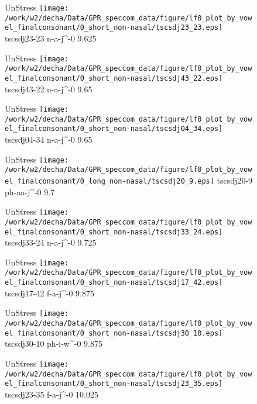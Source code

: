 \documentclass{article}
\begin{document}
\begin{figure}[t]
\begin{minipage}[b]{.24\textwidth}
UnStress
\centering
\texttt{[image: /work/w2/decha/Data/GPR\_speccom\_data/figure/lf0\_plot\_by\_vowel\_finalconsonant/0\_short\_non-nasal/tscsdj23\_23.eps]}
tscsdj23-23 n-a-j\textasciicircum-0 9.625
\end{minipage}
\begin{minipage}[b]{.24\textwidth}
UnStress
\centering
\texttt{[image: /work/w2/decha/Data/GPR\_speccom\_data/figure/lf0\_plot\_by\_vowel\_finalconsonant/0\_short\_non-nasal/tscsdj43\_22.eps]}
tscsdj43-22 n-a-j\textasciicircum-0 9.65
\end{minipage}
\begin{minipage}[b]{.24\textwidth}
UnStress
\centering
\texttt{[image: /work/w2/decha/Data/GPR\_speccom\_data/figure/lf0\_plot\_by\_vowel\_finalconsonant/0\_short\_non-nasal/tscsdj04\_34.eps]}
tscsdj04-34 n-a-j\textasciicircum-0 9.65
\end{minipage}
\begin{minipage}[b]{.24\textwidth}
UnStress
\centering
\texttt{[image: /work/w2/decha/Data/GPR\_speccom\_data/figure/lf0\_plot\_by\_vowel\_finalconsonant/0\_long\_non-nasal/tscsdj20\_9.eps]}
tscsdj20-9 ph-aa-j\textasciicircum-0 9.7
\end{minipage}
\end{figure}
\clearpage
\begin{figure}[t]
\begin{minipage}[b]{.24\textwidth}
UnStress
\centering
\texttt{[image: /work/w2/decha/Data/GPR\_speccom\_data/figure/lf0\_plot\_by\_vowel\_finalconsonant/0\_short\_non-nasal/tscsdj33\_24.eps]}
tscsdj33-24 n-a-j\textasciicircum-0 9.725
\end{minipage}
\begin{minipage}[b]{.24\textwidth}
UnStress
\centering
\texttt{[image: /work/w2/decha/Data/GPR\_speccom\_data/figure/lf0\_plot\_by\_vowel\_finalconsonant/0\_short\_non-nasal/tscsdj17\_42.eps]}
tscsdj17-42 f-a-j\textasciicircum-0 9.875
\end{minipage}
\begin{minipage}[b]{.24\textwidth}
UnStress
\centering
\texttt{[image: /work/w2/decha/Data/GPR\_speccom\_data/figure/lf0\_plot\_by\_vowel\_finalconsonant/0\_short\_non-nasal/tscsdj30\_10.eps]}
tscsdj30-10 ph-i-w\textasciicircum-0 9.875
\end{minipage}
\begin{minipage}[b]{.24\textwidth}
UnStress
\centering
\texttt{[image: /work/w2/decha/Data/GPR\_speccom\_data/figure/lf0\_plot\_by\_vowel\_finalconsonant/0\_short\_non-nasal/tscsdj23\_35.eps]}
tscsdj23-35 f-a-j\textasciicircum-0 10.025
\end{minipage}
\end{figure}
\end{document}
